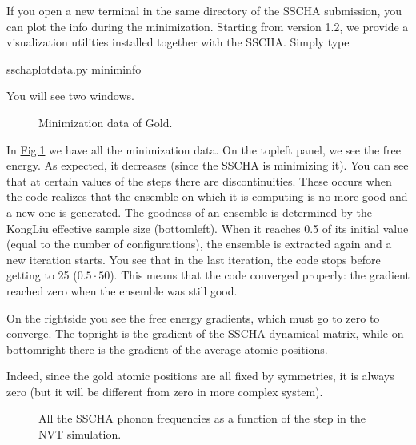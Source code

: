 \documentclass[a4paper,11pt,english]{sphinxmanual}
\let\sphinxpxdimen\pdfpxdimen\else\newdimen\sphinxpxdimen
\begin{document}
\sphinxAtStartPar
If you open a new terminal in the same directory of the SSCHA submission, you can plot the info during the minimization.
Starting from version 1.2, we provide a visualization utilities installed together with the SSCHA.
Simply type

\begin{sphinxVerbatim}[commandchars=\\\{\}]
\PYGZdl{} sscha\PYGZhy{}plot\PYGZhy{}data.py minim\PYGZus{}info
\end{sphinxVerbatim}

\sphinxAtStartPar
You will see two windows.

\begin{figure}[htbp]
\centering
\capstart

\noindent\sphinxincludegraphics[width=400\sphinxpxdimen]{{gold_minim}.png}
\caption{Minimization data of Gold.}\label{\detokenize{start:id1}}\label{\detokenize{start:fig-goldminim}}\end{figure}

\sphinxAtStartPar
In \hyperref[\detokenize{start:fig-goldminim}]{Fig.\@ \ref{\detokenize{start:fig-goldminim}}} we have all the minimization data. On the top\sphinxhyphen{}left panel, we see the free energy. As expected, it decreases (since the SSCHA is minimizing it).
You can see that at certain values of the steps there are discontinuities.
These occurs when the code realizes that the ensemble on which it is computing is no more good and a new one is generated. The goodness of an ensemble is determined by the Kong\sphinxhyphen{}Liu effective sample size (bottom\sphinxhyphen{}left).
When it reaches 0.5 of its initial value (equal to the number of configurations), the ensemble is extracted again and a new iteration starts. You see that in the last iteration, the code stops before getting to 25 (\(0.5\cdot 50\)). This means that the code converged properly: the gradient reached zero when the ensemble was still good.

\sphinxAtStartPar
On the right\sphinxhyphen{}side you see the free energy gradients, which must go to zero to converge. The top\sphinxhyphen{}right is the gradient of the SSCHA dynamical matrix, while on bottom\sphinxhyphen{}right there is the gradient of the average atomic positions.

\sphinxAtStartPar
Indeed, since the gold atomic positions are all fixed by symmetries, it is always zero (but it will be different from zero in more complex system).

\begin{figure}[htbp]
\centering
\capstart

\noindent\sphinxincludegraphics[width=400\sphinxpxdimen]{{frequency_minim}.png}
\caption{All the SSCHA phonon frequencies as a function of the step in the NVT simulation.}\label{\detokenize{start:id2}}\label{\detokenize{start:fig-goldfreqs}}\end{figure}
\end{document}
